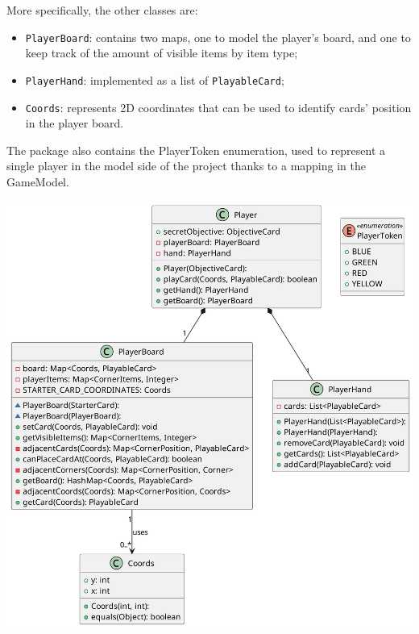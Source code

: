 \documentclass{article}
\begin{document}
\noindent
More specifically, the other classes are:
\begin{itemize}
    \item \texttt{PlayerBoard}: contains two maps, one to model the player's board, and one to keep track of the amount of visible items by item type;
    \item \texttt{PlayerHand}: implemented as a list of \texttt{PlayableCard};
    \item \texttt{Coords}: represents 2D coordinates that can be used to identify cards' position in the player board.
\end{itemize}
\noindent
The package also contains the PlayerToken enumeration, used to represent a single player in the model side of the project thanks to a mapping in the GameModel.

\begin{center}
    \hspace*{-2cm}\includegraphics[scale=0.1]{player.png}
\end{center}
\end{document}

